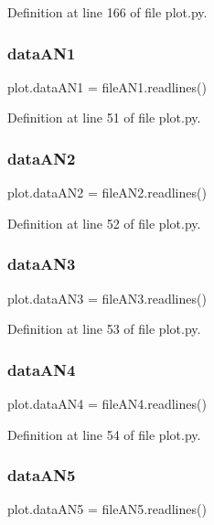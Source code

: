 Definition at line 166 of file plot.\+py.

\mbox{\label{namespaceplot_a5af3d98497eb6545ad1f16d58e67a7c5}} 
\subsubsection{data\+A\+N1}
{\footnotesize\ttfamily plot.\+data\+A\+N1 = file\+A\+N1.\+readlines()}



Definition at line 51 of file plot.\+py.

\mbox{\label{namespaceplot_aefc13326a443f6f08a4c10f0d6d89e3c}} 
\subsubsection{data\+A\+N2}
{\footnotesize\ttfamily plot.\+data\+A\+N2 = file\+A\+N2.\+readlines()}



Definition at line 52 of file plot.\+py.

\mbox{\label{namespaceplot_a3420ed79c1c1e4e1b65a32b0d802fcf3}} 
\subsubsection{data\+A\+N3}
{\footnotesize\ttfamily plot.\+data\+A\+N3 = file\+A\+N3.\+readlines()}



Definition at line 53 of file plot.\+py.

\mbox{\label{namespaceplot_a65158d7a643edd24d0190afd45bd390a}} 
\subsubsection{data\+A\+N4}
{\footnotesize\ttfamily plot.\+data\+A\+N4 = file\+A\+N4.\+readlines()}



Definition at line 54 of file plot.\+py.

\mbox{\label{namespaceplot_aaa47de71e9a0777f0611d54e342f5675}} 
\subsubsection{data\+A\+N5}
{\footnotesize\ttfamily plot.\+data\+A\+N5 = file\+A\+N5.\+readlines()}



